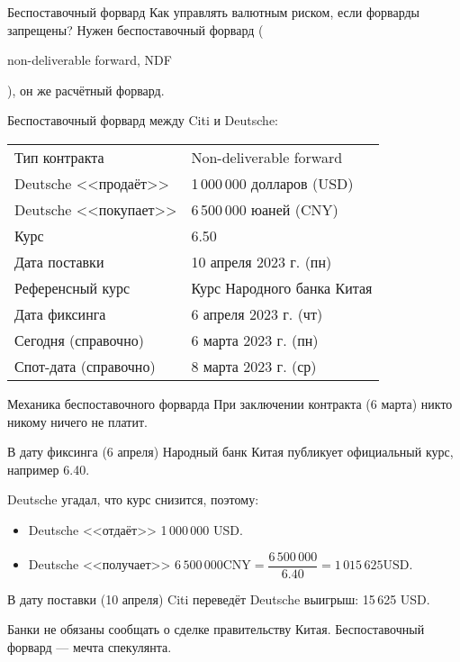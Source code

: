 \documentclass{beamer}
\newcommand{\en}[1]{\begin{otherlanguage}{english}#1\end{otherlanguage}}
\begin{document}
\begin{frame}{Беспоставочный форвард}
\justify
Как управлять валютным риском, если форварды запрещены? Нужен \alert{беспоставочный форвард} (\en{non-deliverable forward, NDF}), он же расчётный форвард.

\justify
Беспоставочный форвард между Citi и Deutsche:

\justify
\centering
\begin{tabular}{l|l}
	Тип контракта 		   & Non-deliverable forward		\\
	Deutsche <<продаёт>>  & 1\,000\,000 долларов (USD)	\\
	Deutsche <<покупает>> & 6\,500\,000 юаней (CNY)		\\
	Курс		 		      & 6.50 						\\
	Дата поставки		   & 10 апреля 2023 г. (пн) \\
	Референсный курс	   & Курс Народного банка Китая	\\
	Дата фиксинга		   & 6 апреля 2023 г. (чт) \\
	Сегодня (справочно)	& 6 марта 2023 г. (пн) \\
	Спот-дата (справочно) & 8 марта 2023 г. (ср)
\end{tabular}
\end{frame}



\begin{frame}{Механика беспоставочного форварда}
\justify
При заключении контракта (6 марта) никто никому ничего не платит.

\justify
В дату фиксинга (6 апреля) Народный банк Китая публикует официальный курс, например 6.40.

\justify
Deutsche угадал, что курс снизится, поэтому:
\begin{itemize}
\justifying
\item Deutsche <<отдаёт>> 1\,000\,000 USD.
\item Deutsche <<получает>> $6\,500\,000 \text{CNY} = \dfrac{6\,500\,000}{6.40} = 1\,015\,625 \text{USD}$.
\end{itemize}

\justify
В дату поставки (10 апреля) Citi переведёт Deutsche выигрыш: 15\,625 USD.

\justify Банки не обязаны сообщать о сделке правительству Китая. Беспоставочный форвард --- мечта спекулянта.
\end{frame}
\end{document}
